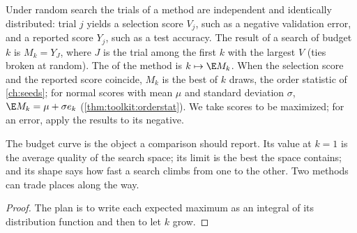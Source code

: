 \begin{refsection}
Under random search the trials of a method are independent and identically distributed: trial $j$ yields a selection score $V_j$, such as a negative validation error, and a reported score $Y_j$, such as a test accuracy. The result of a search of budget $k$ is $M_k=Y_J$, where $J$ is the trial among the first $k$ with the largest $V$ (ties broken at random). The  of the method is $k\mapsto\E M_k$. When the selection score and the reported score coincide, $M_k$ is the best of $k$ draws, the order statistic of \cref{ch:seeds}; for normal scores with mean $\mu$ and standard deviation $\sigma$, $\E M_k=\mu+\sigma e_k$ (\cref{thm:toolkit:orderstat}). We take scores to be maximized; for an error, apply the results to its negative.

The budget curve is the object a comparison should report. Its value at $k=1$ is the average quality of the search space; its limit is the best the space contains; and its shape says how fast a search climbs from one to the other. Two methods can trade places along the way.


\begin{proof}
The plan is to write each expected maximum as an integral of its distribution function and then to let $k$ grow.


\end{proof}
\end{refsection}
